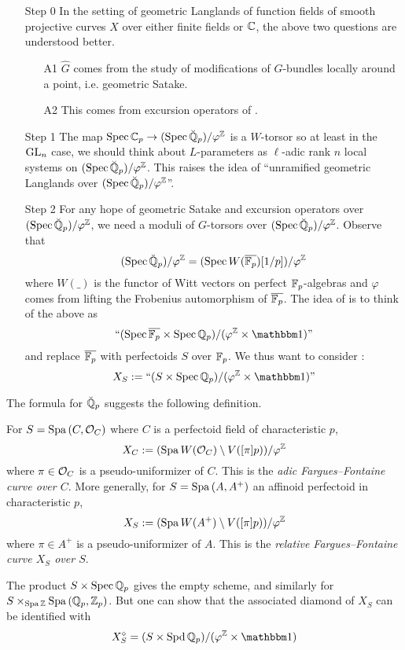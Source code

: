 \documentclass{article}
\begin{document}
\begin{enumerate}
  \item [Step 0] In the setting of 
  geometric Langlands of function fields
  of smooth projective curves $X$ over either finite fields or $\mathbb{C}$,
  the above two questions are understood better.
  \begin{enumerate}
    \item [A1] $\widehat{G}$ comes from the study of 
    modifications of $G$-bundles locally around a point,
    i.e. geometric Satake.
    \item [A2] This comes from excursion operators of \cite{Laf18}.
  \end{enumerate}
  \item [Step 1] 
  The map $\operatorname{Spec} \mathbb{C}_p \to (\operatorname{Spec} \breve{\mathbb{Q}}_p) / \varphi^{\mathbb{Z}}$
  is a $W$-torsor so at least in the $\operatorname{GL}_n$ case,
  we should think about $L$-parameters as $\ell$-adic
  rank $n$ local systems on $(\operatorname{Spec} \breve{\mathbb{Q}}_p) / \varphi^{\mathbb{Z}}$.
  This raises the idea of ``unramified geometric Langlands
  over $(\operatorname{Spec} \breve{\mathbb{Q}}_p) / \varphi^{\mathbb{Z}}$''.
  
  \item [Step 2]
  For any hope of geometric Satake and excursion operators 
  over $(\operatorname{Spec} \breve{\mathbb{Q}}_p) / \varphi^{\mathbb{Z}}$,
  we need a moduli of $G$-torsors over 
  $(\operatorname{Spec} \breve{\mathbb{Q}}_p) / \varphi^{\mathbb{Z}}$.
  Observe that \[
    (\operatorname{Spec} \breve{\mathbb{Q}}_p) / \varphi^{\mathbb{Z}} = 
    (\operatorname{Spec} W(\overline{\mathbb{F}_p})[1 / p]) / \varphi^{\mathbb{Z}}
  \]
  where $W(\_)$ is the functor of Witt vectors on perfect $\mathbb{F}_p$-algebras 
  and $\varphi$ comes from lifting the Frobenius
  automorphism of $\overline{\mathbb{F}_p}$.
  The idea of \cite{FS24} is to 
  think of the above as 
  \[
    \text{``$(\SPEC \overline{\bF_p} \times \SPEC \bQ_p )
    / (\varphi^\bZ \times \id)$''}
  \]
  and replace $\overline{\mathbb{F}_p}$ with perfectoids $S$ over $\mathbb{F}_p$.
  We thus want to consider : 
  \[
    X_S := \text{``$(S \times \SPEC \bQ_p)
    / (\varphi^\bZ \times \id)$''}
  \]
\end{enumerate}
The formula for $\breve{\mathbb{Q}}_p$ suggests the following definition.
\begin{dfn}

  For $S = \mathrm{Spa}\, (C , \mathcal{O}_C)$ where 
  $C$ is a perfectoid field of characteristic $p$,
  \[
    X_C := (\mathrm{Spa}\, W(\mathcal{O}_C) \setminus V([\pi] p)) / \varphi^{\mathbb{Z}}
  \]
  where $\pi \in \mathcal{O}_C$ is a pseudo-uniformizer of $C$.
  This is the \emph{adic Fargues--Fontaine curve over $C$}.
  More generally,
  for $S = \mathrm{Spa}\,(A , A^+)$ an affinoid perfectoid in characteristic $p$,
  \[
    X_S := (\mathrm{Spa}\, W(A^+) \setminus V([\pi] p)) / \varphi^{\mathbb{Z}}
  \]
  where $\pi \in A^+$ is a pseudo-uniformizer of $A$.
  This is the \emph{relative Fargues--Fontaine curve $X_S$ over $S$}.
\end{dfn}
The product $S \times \operatorname{Spec} \mathbb{Q}_p$ gives the empty scheme,
and similarly for $S \times_{\mathrm{Spa}\, \mathbb{Z}} \mathrm{Spa}\,(\mathbb{Q}_p , \mathbb{Z}_p)$.
But one can show that the associated diamond of $X_S$
can be identified with
\[
  X_S^\diamond = (S \times \SPD \bQ_p) / (\varphi^\bZ \times \id)
\]
\end{document}
